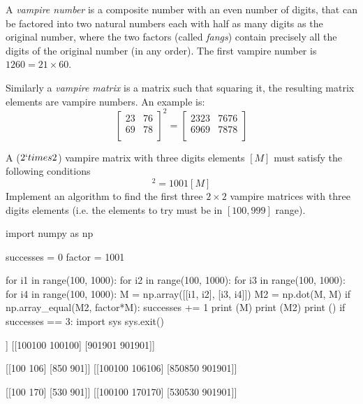 \cprotEnv\begin{question}
A \emph{vampire number} is a composite number with an even number of digits, that can be factored into two natural numbers each with half as many digits as the original number, where the two factors (called \emph{fangs}) contain precisely all the digits of the original number (in any order). The first vampire number is $1260 = 21 \times 60$.

Similarly a \emph{vampire matrix} is a matrix such that squaring it, the resulting matrix elements are vampire numbers. An example is:
\begin{equation*}
\begin{bmatrix}
23 & 76 \\
69 & 78 \\
\end{bmatrix}^{2} =
\begin{bmatrix}
2323 & 7676 \\
6969 & 7878 \\
\end{bmatrix}
\end{equation*}

A ($2`times 2$) vampire matrix with three digits elements $[M]$ must satisfy the following conditions
\begin{equation*}
[M]^2 = 1001 [M]
\end{equation*}
\noindent
Implement an algorithm to find the first three $2\times 2$ vampire matrices with three digits elements (i.e. the elements to try must be in $[100,999]$ range). 
\end{question}
\cprotEnv\begin{solution}
\begin{ipython}
import numpy as np

successes = 0
factor = 1001

for i1 in range(100, 1000):
    for i2 in range(100, 1000):
        for i3 in range(100, 1000):
            for i4 in range(100, 1000):
                M = np.array([[i1, i2], [i3, i4]])
                M2 = np.dot(M, M)
                if np.array_equal(M2, factor*M):
                    successes += 1
                    print (M)
                    print (M2)
                    print ()
                    if successes == 3:
                        import sys
                        sys.exit()
\end{ipython}
\begin{ioutput}
[[100 100]
 [901 901]]
[[100100 100100]
 [901901 901901]]

[[100 106]
 [850 901]]
[[100100 106106]
 [850850 901901]]

[[100 170]
 [530 901]]
[[100100 170170]
 [530530 901901]]
\end{ioutput}
\end{solution}

